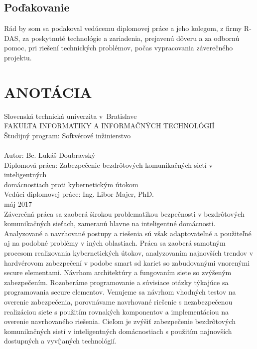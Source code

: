 \documentclass[12pt,a4paper,oneside,openright]{report}
\begin{document}
\section*{Poďakovanie}
Rád by som sa poďakoval vedúcemu diplomovej práce a jeho kolegom, z firmy R-DAS, za poskytnuté technológie a zariadenia, prejavenú dôveru a za odbornú pomoc, pri riešení technických problémov, počas vypracovania záverečného projektu.

\newpage
\thispagestyle{empty}
\mbox{}

\onehalfspacing
\chapter*{ANOTÁCIA}	
\thispagestyle{empty}
\noindent Slovenská technická univerzita v~Bratislave \\
FAKULTA INFORMATIKY A INFORMAČNÝCH TECHNOLÓGIÍ \\
Študijný program: \tabto{4.7cm}Softvérové inžinierstvo \\ \\
Autor: \tabto{4.7cm}Bc. Lukáš Doubravský \\
Diplomová práca: 
\tabto{4.7cm}Zabezpečenie bezdrôtových komunikačných sietí v inteligentných\\ \tabto{4.7cm}domácnostiach proti kybernetickým útokom  \\
Vedúci diplomovej práce: \tabto{4.7cm}Ing. Libor Majer, PhD. \\
máj 2017 \\

Záverečná práca sa zaoberá širokou problematikou bezpečnosti v bezdrôtových komunikačných sieťach, zameranú hlavne na inteligentné domácnosti. Analyzované a navrhované postupy a riešenia sú však adaptovateľné a použiteľné aj na podobné problémy v iných oblastiach.
Práca sa zaoberá samotným procesom realizovania kybernetických útokov, analyzovaním najnovších trendov v hardvérovom zabezpečení v podobe smart sd kariet so zabudovanými vnorenými secure elementami. Návrhom architektúry a fungovaním siete so zvýšeným zabezpečením.
Rozoberáme programovanie a súvisiace otázky týkajúce sa programovania secure elementov.
Venujeme sa návrhom vhodných testov na overenie zabezpečenia, porovnávame navrhované riešenie s nezabezpečenou realizáciou siete s použitím rovnakých komponentov a implementáciou na overenie navrhovaného riešenia.
Cieľom je zvýšiť zabezpečenie bezdrôtových komunikačných sietí v inteligentných domácnostiach s použitím najnovších dostupných a vyvíjaných technológií.
\\ \\
\end{document}
